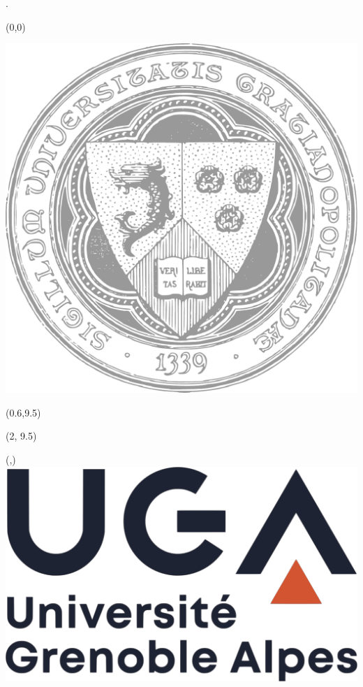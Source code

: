 \documentclass[a4paper, twoside]{report}
\begin{document}
\thispagestyle{empty}
.
\begin{textblock}{5}(0,0)
	\begin{center}
	    	\includegraphics[scale=0.30]{cover/uga_logo.pdf}
	\end{center}{}
	\vspace{300mm}
\end{textblock}

\begin{textblock}{1}(0.6,9.5)
	
	\Huge{}
\end{textblock}

\begin{textblock}{1}(2, 9.5)
	\Large{}
\end{textblock}

\begin{textblock}{1}(\hpos,\vpos)
	\includegraphics[scale=0.1]{cover/uga_logo_2.pdf}	
\end{textblock}
\end{document}
